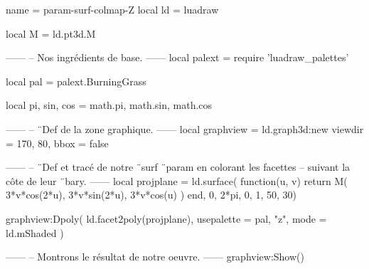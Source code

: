 \documentclass[border = 3pt]{standalone}
\begin{document}
\begin{luadraw}{name = param-surf-colmap-Z}
local ld = luadraw

local M = ld.pt3d.M

------
-- Nos ingrédients de base.
------
local palext = require 'luadraw_palettes'

local pal = palext.BurningGrass

local pi, sin, cos = math.pi, math.sin, math.cos

------
-- ¨Def de la zone graphique.
------
local graphview = ld.graph3d:new{
  viewdir = {170, 80},
  bbox    = false
}

------
-- ¨Def et tracé de notre ¨surf ¨param en colorant les facettes
-- suivant la côte de leur ¨bary.
------
local projplane = ld.surface(
  function(u, v)
    return M(
      3*v*cos(2*u),
      3*v*sin(2*u),
      3*v*cos(u)
    )
  end,
  0, 2*pi, 0, 1,
  {50, 30})

graphview:Dpoly(
  ld.facet2poly(projplane),
  {
    usepalette = {pal, "z"},
    mode       = ld.mShaded
  })

------
-- Montrons le résultat de notre oeuvre.
------
graphview:Show()
\end{luadraw}
\end{document}
